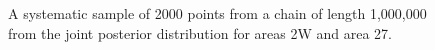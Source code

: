  \begin{figure}[!tbp]
	\centering
	\\
	\\
	\caption{A systematic sample of 2000 points from a chain of length 1,000,000 from the joint posterior distribution for areas 2W and area 27. }\label{Results:Minor:mcmcTrace}
\end{figure}

